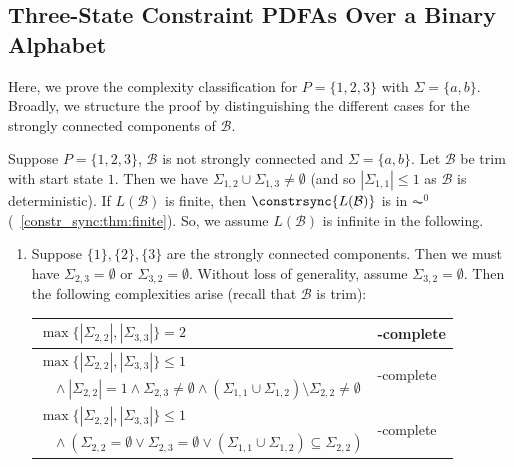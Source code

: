 \subsection{Three-State Constraint PDFAs Over a Binary Alphabet}
\label{sec:constr_sync:three_states}

Here, we prove the complexity classification
for $P = \{1,2,3\}$ with $\Sigma = \{a,b\}$.
Broadly, we structure the proof by distinguishing the different cases for the strongly connected components of $\mathcal B$.

\begin{theorem} 
	\label{constr_sync:thm:three-states}
	Suppose $P = \{1,2,3\}$, $\mathcal B$ is not strongly connected and $\Sigma = \{a,b\}$.
	Let $\mathcal B$ be trim with start state $1$. Then
	we have $\Sigma_{1,2} \cup \Sigma_{1,3} \ne \emptyset$ (and so $|\Sigma_{1,1}| \le 1$ as $\mathcal B$ is deterministic). 
	If $L(\mathcal B)$ is finite, then $\constrsync{L(\mathcal B)}$
	is in $\AC^0$ (\THM~\ref{constr_sync:thm:finite}). So, we assume $L(\mathcal B)$
	is infinite in the following.
	
	\begin{enumerate}		
		\item Suppose $\{1\}, \{2\}, \{3\}$ are the strongly connected components. Then we must have $\Sigma_{2,3} = \emptyset$
		or $\Sigma_{3,2} = \emptyset$.
		Without loss of generality, assume $\Sigma_{3,2} = \emptyset$.
		Then the following complexities arise (recall that $\mathcal B$ is trim):
		
		\begin{center} 
			\begin{tabular}{l|l}
				$\max\{ |\Sigma_{2,2}|, |\Sigma_{3,3}| \} = 2$ & \NL-complete \\ \hline 
				$\max\{ |\Sigma_{2,2}|, |\Sigma_{3,3}| \} \le 1$ & \multirow{ 2}{*}{\NP-complete} \\
				$\quad\land |\Sigma_{2,2}| = 1 \land \Sigma_{2,3} \ne \emptyset \land (\Sigma_{1,1} \cup \Sigma_{1,2}) \setminus \Sigma_{2,2} \ne \emptyset$ & \\ \hline 
				$\max\{ |\Sigma_{2,2}|, |\Sigma_{3,3}| \} \le 1$ & \multirow{ 2}{*}{\LOGSPACE-complete} \\
				$\quad\land ( \Sigma_{2,2} = \emptyset \lor \Sigma_{2,3} = \emptyset \lor (\Sigma_{1,1} \cup \Sigma_{1,2}) \subseteq \Sigma_{2,2} )$ & \\ \hline 
			\end{tabular}
        \end{center}		
		

\end{enumerate}
\end{theorem}
